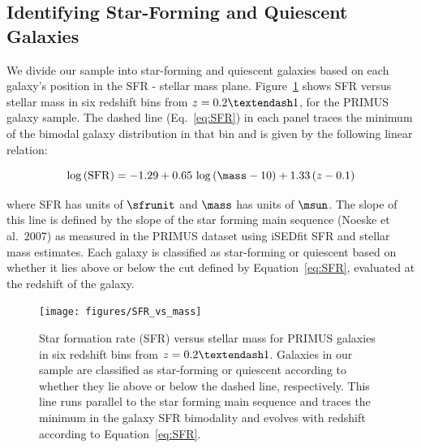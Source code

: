 
\subsection{Identifying Star-Forming and Quiescent Galaxies}\label{sec:SFQ}

We divide our sample into star-forming and quiescent galaxies based on each 
galaxy's position in the SFR - stellar mass plane. 
Figure~\ref{fig:SFR_vs_mass} shows SFR versus stellar mass in six redshift bins from ${z=0.2\textendash1}$, for the PRIMUS galaxy sample.
The dashed line (Eq.~\ref{eq:SFR}) in each panel traces the minimum of the bimodal galaxy distribution in that bin and is given by the following linear relation:

\begin{equation}\label{eq:SFR}
\log\,({\rm SFR}) = -1.29 + 0.65\,\log\,(\mass - 10) + 1.33\,(z - 0.1)
\end{equation}

\noindent where SFR has units of $\sfrunit$ and $\mass$ has units of $\msun$.
The slope of this line is defined by the slope of the star forming main sequence  (Noeske et al.~2007) as measured in the PRIMUS dataset using iSEDfit SFR and stellar mass estimates. 
Each galaxy is classified as star-forming or quiescent based on whether it lies above or below the cut defined by Equation~\ref{eq:SFR}, evaluated at the redshift of the galaxy.


\begin{figure}
  \centering
  \texttt{[image: figures/SFR\_vs\_mass]}
  \caption{Star formation rate (SFR) versus stellar mass for PRIMUS galaxies in six redshift bins from ${z=0.2\textendash1}$.
Galaxies in our sample are classified as star-forming or quiescent according to whether they lie above or below the dashed line, respectively.
This line runs parallel to the star forming main sequence and traces the minimum in the galaxy SFR bimodality and evolves with redshift according to Equation~\ref{eq:SFR}.
}
  \label{fig:SFR_vs_mass}
\end{figure}


